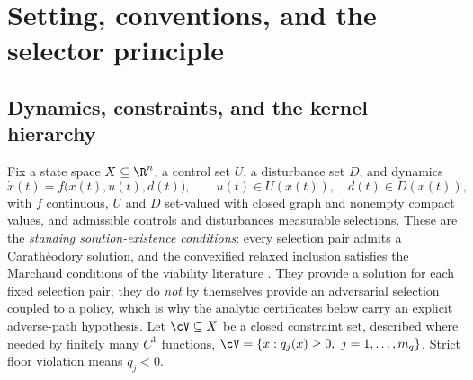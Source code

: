 \section{Setting, conventions, and the selector principle}\label{sec:setting}

\subsection{Dynamics, constraints, and the kernel hierarchy}\label{sec:kernels}

Fix a state space $X\subseteq\R^n$, a control set $U$, a disturbance set $D$, and dynamics
\begin{equation}\label{eq:dyn}
\dot x(t)=f\bigl(x(t),u(t),d(t)\bigr),\qquad u(t)\in U(x(t)),\quad d(t)\in D(x(t)),
\end{equation}
with $f$ continuous, $U$ and $D$ set-valued with closed graph and nonempty compact values, and admissible controls and disturbances measurable selections. These are the \emph{standing solution-existence conditions}: every selection pair admits a Carath\'eodory solution, and the convexified relaxed inclusion satisfies the Marchaud conditions of the viability literature \citep{aubin1991}. They provide a solution for each fixed selection pair; they do \emph{not} by themselves provide an adversarial selection coupled to a policy, which is why the analytic certificates below carry an explicit adverse-path hypothesis. Let $\cV\subseteq X$ be a closed constraint set, described where needed by finitely many $C^1$ functions, $\cV=\{x:q_j(x)\ge0,\ j=1,\dots,m_q\}$. Strict floor violation means $q_j<0$.

